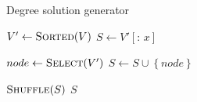 \begin{algorithm}[t]
  \caption{Degree solution generator}\label{alg:DEGREE-SMART-INIT}
  \begin{algorithmic}[1]
    \State $V' \leftarrow \Call{Sorted}{V}$
    \State $S \leftarrow V'\left[ {:}\,x \right]$

    \State $node \leftarrow \Call{Select}{V'}$
    \State $S \leftarrow S \cup \left\{ node \right\}$
    \EndIf
    \EndWhile

    \State $\Call{Shuffle}{S}$
    \State \Return $S$
    \EndFunction
  \end{algorithmic}
\end{algorithm}
